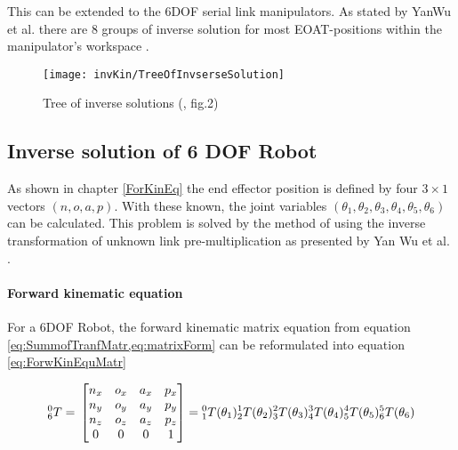 This can be extended to the 6\ac{DOF} serial link manipulators.
As stated by YanWu et al. there are 8 groups of inverse solution for most \ac{EOAT}-positions within the manipulator's workspace \cite{invKinSolYanWu}. 

\begin{figure}[H]
	\texttt{[image: invKin/TreeOfInvserseSolution]}
	\caption{Tree of inverse solutions (\cite{invKinSolYanWu}, fig.2)}
	\label{fig:invKinTree}
\end{figure}

\subsection{Inverse solution of 6 \ac{DOF} Robot}

As shown in chapter \ref{ForKinEq} the end effector position is defined by four $3 \times 1$ vectors $ (n,o,a,p) $. With these known, the joint variables $(\theta_1, \theta_2, \theta_3, \theta_4, \theta_5, \theta_6)$ can be calculated.
This problem  is solved by the method of using the inverse transformation of unknown link pre-multiplication as presented by Yan Wu et al. \cite{invKinSolYanWu}. 

\paragraph{Forward kinematic equation}
For a 6\ac{DOF} Robot, the  forward kinematic matrix equation from equation \cref{eq:SummofTranfMatr,eq:matrixForm} can be reformulated into equation \ref{eq:ForwKinEquMatr}

\begin{equation}\label{eq:ForwKinEquMatr}
	^0_6T = \\
	\begin{bmatrix}
n_x & o_x & a_x & p_x \\
n_y & o_y & a_y & p_y \\
n_z & o_z & a_z & p_z \\
0 & 0 & 0 & 1 \\
\end{bmatrix}
=
\phantom{}^0_1T(\theta_1)\phantom{}^1_2T(\theta_2)\phantom{}^2_3T(\theta_3)\phantom{}^3_4T(\theta_4)\phantom{}^4_5T(\theta_5)\phantom{}^5_6T(\theta_6)\\
\end{equation}

